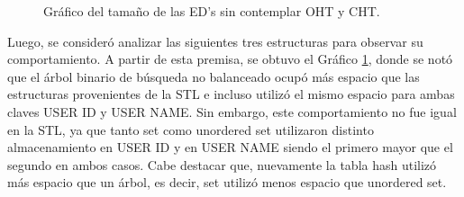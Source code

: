 \begin{multicols}{2}
\begin{figure}[H]
    \centering
    
    \caption{Gráfico del tamaño de las ED's sin contemplar OHT y CHT.}
    \label{fig:sizes_estructuras_sin_HT}
\end{figure}
Luego, se consideró analizar las siguientes tres estructuras para observar su comportamiento. A partir de esta premisa, se obtuvo el Gráfico \ref{fig:sizes_estructuras_sin_HT}, donde se notó que el árbol binario de búsqueda no balanceado ocupó más espacio que las estructuras provenientes de la STL e incluso utilizó el mismo espacio para ambas claves USER ID y USER NAME. Sin embargo, este comportamiento no fue igual en la STL, ya que tanto set como unordered set utilizaron distinto almacenamiento en USER ID y en USER NAME siendo el primero mayor que el segundo en ambos casos. Cabe destacar que, nuevamente la tabla hash utilizó más espacio que un árbol, es decir, set utilizó menos espacio que unordered set.


\end{multicols}
